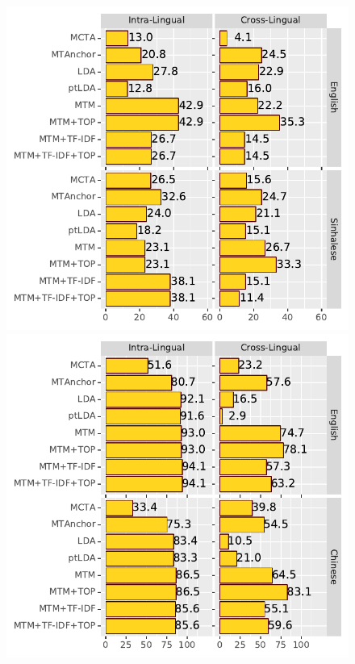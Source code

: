 
\begin{figure}[t]
  \centering
  \includegraphics[width=\linewidth]{2019_emnlp_mtm/auto_fig/lorelei.pdf}
  \includegraphics[width=\linewidth]{2019_emnlp_mtm/auto_fig/wiki.pdf}

\end{figure}
